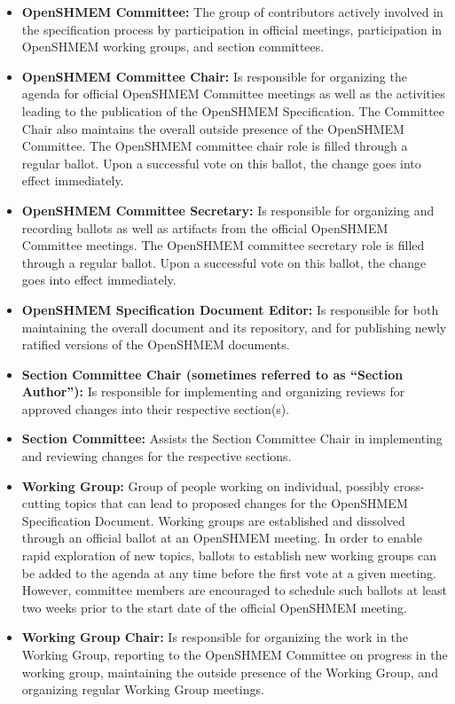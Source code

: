 \begin{itemize}
\item {\bf OpenSHMEM Committee:} The group of
  contributors
  actively involved in the
  specification process by participation in official meetings,
  participation in OpenSHMEM working groups, and section committees.
\item {\bf OpenSHMEM Committee Chair:} Is responsible for organizing the agenda
  for official OpenSHMEM Committee meetings as well as the activities leading to the
  publication of the OpenSHMEM Specification. The Committee
  Chair also maintains the overall outside presence of the OpenSHMEM Committee.
  The OpenSHMEM committee chair role is filled through a regular
  ballot.  Upon a successful vote on this ballot, the change goes into effect
  immediately.
\item {\bf OpenSHMEM Committee Secretary:} Is responsible for organizing and
  recording ballots as well as artifacts from the official OpenSHMEM Committee
  meetings.
  The OpenSHMEM committee secretary role is filled through a regular
  ballot.  Upon a successful vote on this ballot, the change goes into effect
  immediately.
\item {\bf OpenSHMEM Specification Document Editor:} Is responsible for both
  maintaining the overall document and its repository, and for
  publishing newly ratified versions of the OpenSHMEM documents.
\item {\bf Section Committee Chair (sometimes referred to as ``Section
  Author''):} Is responsible for implementing and organizing reviews
  for approved changes into their respective section(s).
\item {\bf Section Committee:} Assists the Section Committee Chair in
  implementing and reviewing changes for the respective sections.
\item {\bf Working Group:} Group of people working on individual,
  possibly cross-cutting topics that can lead to proposed changes for
  the OpenSHMEM Specification Document.
  Working groups are established and dissolved through an official
  ballot at an OpenSHMEM meeting.  In order to enable rapid exploration of new
  topics, ballots to establish new working groups can be added to the agenda at
  any time before the first vote at a given meeting.  However, committee
  members are encouraged to schedule such ballots at least two weeks prior to
  the start date of the official OpenSHMEM meeting.
\item {\bf Working Group Chair:} Is responsible for organizing the
  work in the Working Group, reporting to the OpenSHMEM Committee on progress in
  the working group, maintaining the outside presence of the Working
  Group, and organizing regular Working Group meetings.
\end{itemize}

